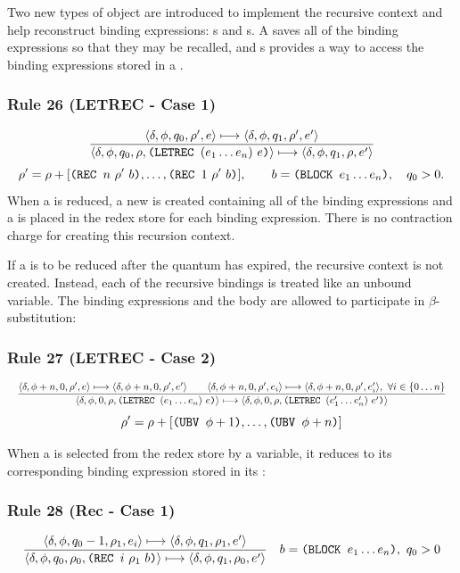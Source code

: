 Two new types of object are introduced to implement the recursive context and
help reconstruct  binding expressions: s and
s. A  saves all of the binding expressions so that they
may be recalled, and s provides a way to access the binding
expressions stored in a .

\subsubsection*{Rule 26 (LETREC - Case 1)}
\[
\frac{
\cfg{\delta}{\phi}{q_0}{\rho'}{e}\redsto
\cfg{\delta}{\phi}{q_1}{\rho'}{e'}
}{
\cfg{\delta}{\phi}{q_0}{\rho}{\THOR{(LETREC }(e_1\ldots e_n)\ e\THOR{)}}\redsto
\cfg{\delta}{\phi}{q_1}{\rho}{e'}
}
\]
\[
\rho'=\rho+[\THOR{(REC }n\ \rho'\ b\THOR{)},\ldots,
            \THOR{(REC }1\ \rho'\ b\THOR{)}],
\qquad b=\THOR{(BLOCK }e_1\ldots e_n\THOR{)},\quad q_0>0.
\]
When a  is reduced, a new  is created containing all of
the binding expressions and a  is placed in the redex store for each
binding expression. There is no contraction charge for creating this recursion
context.

If a  is to be reduced after the quantum has expired, the recursive
context is not created. Instead, each of the recursive bindings is treated like
an unbound variable. The binding expressions and the body are allowed to
participate in \(\beta\)-substitution:

\subsubsection*{Rule 27 (LETREC - Case 2)}
\[
\resizebox{\textwidth}{!}{$\displaystyle
\frac{
\cfg{\delta}{\phi+n}{0}{\rho'}{e}\redsto
\cfg{\delta}{\phi+n}{0}{\rho'}{e'}
\qquad
\cfg{\delta}{\phi+n}{0}{\rho'}{e_i}\redsto
\cfg{\delta}{\phi+n}{0}{\rho'}{e'_i},\ \forall i\in\{0\ldots n\}
}{
\cfg{\delta}{\phi}{0}{\rho}{\THOR{(LETREC }(e_1\ldots e_n)\ e\THOR{)}}\redsto
\cfg{\delta}{\phi}{0}{\rho}{\THOR{(LETREC }(e'_1\ldots e'_n)\ e'\THOR{)}}
}
$}
\]
\[
\rho'=\rho+[\texttt{(UBV }\phi+1\texttt{)},\ldots,\texttt{(UBV }\phi+n\texttt{)}]
\]

When a  is selected from the redex store by a variable, it reduces to
its corresponding binding expression stored in its :

\subsubsection*{Rule 28 (Rec - Case 1)}
\[
\frac{
\langle \delta,\phi,q_0-1,\rho_1,e_i\rangle\longmapsto
\langle \delta,\phi,q_1,\rho_1,e'\rangle
}{
\langle \delta,\phi,q_0,\rho_0,\texttt{(REC }i\ \rho_1\ b\texttt{)}\rangle\longmapsto
\langle \delta,\phi,q_1,\rho_0,e'\rangle
}
\quad b=\texttt{(BLOCK }e_1\ldots e_n\texttt{)},\ q_0>0
\]

